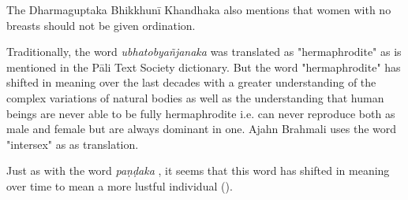 The Dharmaguptaka Bhikkhunī Khandhaka also mentions that women with no breasts should not be given ordination.


Traditionally, the word {\em ubhatob­yañ­janaka } was translated as "hermaphrodite" as is mentioned in the Pāli Text Society dictionary. But the word "hermaphrodite" has shifted in meaning over the last decades with a greater understanding of the complex variations of natural bodies as well as the understanding that human beings are never able to be fully hermaphrodite i.e. can never reproduce both as male and female but are always dominant in one. Ajahn Brahmali uses the word "intersex" as as translation.


Just as with the word {\em paṇḍaka }, it seems that this word has shifted in meaning over time to mean a more lustful individual (\cite{vimala}).